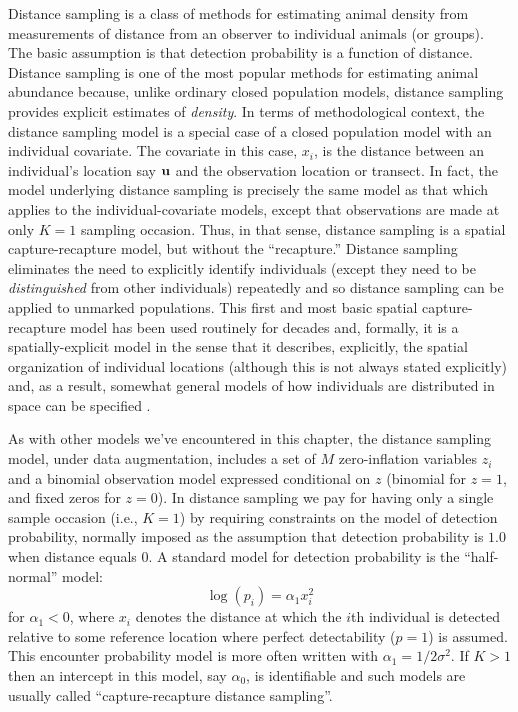 Distance sampling is a class of methods for estimating animal density
from measurements of distance from an observer to individual animals
(or groups). The basic assumption is that detection probability is
 a function of distance. 
Distance sampling is one of the most popular methods for estimating
animal abundance \citep{burnham_etal:1980, buckland_etal:2001,
  buckland_etal:2004book} because, unlike ordinary closed population models,
distance sampling provides explicit estimates of {\it density}.
 In terms of
methodological context, the distance sampling model is a special case
of a closed population model with an individual covariate. The
covariate in this case, $x_{i}$, is the distance between an
individual's location say ${\bf u}$ and the observation location or transect. In
fact, the model underlying distance sampling is precisely the same
model as that which applies to the individual-covariate models, except
that observations are made at only $K=1$ sampling occasion. Thus, in
that sense, distance sampling is a spatial capture-recapture model,
but without the ``recapture.''  Distance sampling  eliminates the need to
explicitly identify individuals (except they need to be {\it
  distinguished} from other individuals) repeatedly and so distance
sampling can be applied to unmarked populations. 
This first and most basic spatial
capture-recapture model has been used routinely for decades and,
formally, it is a spatially-explicit model in the sense that it
describes, explicitly, the spatial organization of individual
locations (although this is not always stated explicitly) and, as a
result, somewhat general models of how individuals are distributed in
space can be specified \citep{hedley_etal:1999, royle_etal:2004,
  johnson_etal:2010, niemi_fernandez:2010, sillett_etal:2012}.

As with other models we've encountered in this chapter, the distance sampling model, under data augmentation,
includes a set of $M$ zero-inflation variables $z_{i}$ and a
binomial observation model expressed conditional on $z$ (binomial for $z=1$, and
fixed zeros for $z=0$).  In distance sampling we pay for having only a
single sample occasion (i.e., $K=1$) by requiring constraints on the model of
detection probability, normally imposed as the assumption that
detection probability is $1.0$ when distance equals 0.  A standard
model for detection probability is the ``half-normal'' model:
\[
\log(p_{i}) = \alpha_{1} x_{i}^{2}
\]
for $\alpha_{1} < 0$, where $x_i$ denotes the distance at which the $i$th
individual is detected relative to some reference location where
perfect detectability ($p=1$) is assumed. This encounter probability
model is more often written with 
$\alpha_{1} =
1/2\sigma^{2}$.  If $K>1$ then an intercept in this model, say $\alpha_{0}$, is
identifiable and such models are usually called ``capture-recapture
distance sampling''\citep{alpizar_pollock:1996,borchers_etal:1998}.


